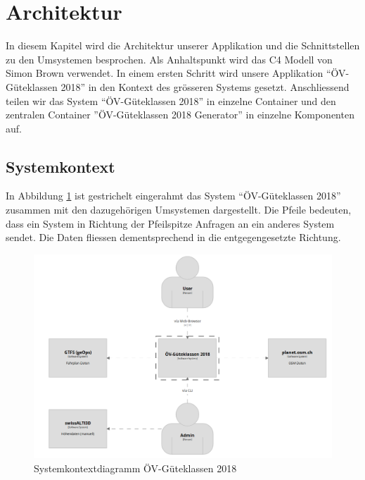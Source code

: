 
\section{Architektur}
\label{Architektur}

In diesem Kapitel wird die Architektur unserer Applikation und die Schnittstellen zu den Umsystemen besprochen.
Als Anhaltspunkt wird das C4 Modell \cite{c4model} von Simon Brown verwendet.
In einem ersten Schritt wird unsere Applikation "`ÖV-Güteklassen 2018"' in den Kontext des grösseren Systems gesetzt.
Anschliessend teilen wir das System "`ÖV-Güteklassen 2018'' in einzelne Container und den zentralen Container ''ÖV-Güteklassen 2018 Generator"' in einzelne Komponenten auf.

\subsection{Systemkontext}
\label{Architektur:Systemkontext}

In Abbildung \ref{fig:system-context-diagram} ist gestrichelt eingerahmt das System "`ÖV-Güteklassen 2018"' zusammen mit den dazugehörigen Umsystemen dargestellt.
Die Pfeile bedeuten, dass ein System in Richtung der Pfeilspitze Anfragen an ein anderes System sendet.
Die Daten fliessen dementsprechend in die entgegengesetzte Richtung.

\begin{figure}[ht]
    \centering
    \includegraphics[width=1\linewidth]{projectdoc/img/systemcontext-diagram.png}
    \caption[Systemkontextdiagramm]{Systemkontextdiagramm ÖV-Güteklassen 2018}
    \label{fig:system-context-diagram}
\end{figure}


